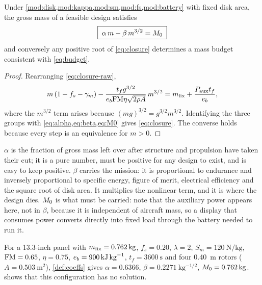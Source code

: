 \begin{theorem}
\label{thm:closure}
Under \cref{mod:disk,mod:kappa,mod:sm,mod:fs,mod:battery} with fixed disk area,
the gross mass of a feasible design satisfies
\begin{equation}
  \boxed{\;\alpha\, m - \beta\, m^{3/2} = M_0\;}
  \label{eq:closure}
\end{equation}
and conversely any positive root of \cref{eq:closure} determines a mass budget
consistent with \cref{eq:budget}.
\end{theorem}

\begin{proof}
Rearranging \cref{eq:closure-raw},
\[
  m\left(1 - f_s - \gamma_m\right)
  - \frac{t_f g^{3/2}}{e_b \mathrm{FM} \eta \sqrt{2\rho A}}\, m^{3/2}
  = m_{\mathrm{fix}} + \frac{P_{\mathrm{aux}} t_f}{e_b},
\]
where the $m^{3/2}$ term arises because
$(mg)^{3/2} = g^{3/2} m^{3/2}$. Identifying the three groups with
\cref{eq:alpha,eq:beta,eq:M0} gives \cref{eq:closure}. The converse holds
because every step is an equivalence for $m>0$.
\end{proof}

\begin{remark}
$\alpha$ is the fraction of gross mass left over after structure and propulsion
have taken their cut; it is a pure number, must be positive for any design to
exist, and is easy to keep positive. $\beta$ carries the mission: it is
proportional to endurance and inversely proportional to specific energy,
figure of merit, electrical efficiency and the square root of disk area. It
multiplies the nonlinear term, and it is where the design dies. $M_0$ is
what must be carried: note that the auxiliary power appears here, not in
$\beta$, because it is independent of aircraft mass, so a display that consumes
power converts directly into fixed load through the battery needed to run it.
\end{remark}

\begin{example}
For a 13.3-inch panel with $m_{\mathrm{fix}} = \SI{0.762}{\kilo\gram}$,
$f_s = 0.20$, $\lambda = 2$, $S_m = \SI{120}{\newton\per\kilo\gram}$,
$\mathrm{FM} = 0.65$, $\eta = 0.75$, $e_b = \SI{900}{\kilo\joule\per\kilo\gram}$,
$t_f = \SI{3600}{\second}$ and four \SI{0.40}{\metre} rotors
($A = \SI{0.503}{\metre\squared}$), \cref{def:coeffs} gives
$\alpha = 0.6366$, $\beta = \SI{0.2271}{\kilo\gram^{-1/2}}$,
$M_0 = \SI{0.762}{\kilo\gram}$.  shows that this
configuration has no solution.
\end{example}

